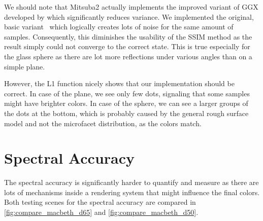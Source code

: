 We should note that Mitsuba2 actually implements the improved variant of GGX developed by \citet{heitz2018sampling} which significantly reduces variance. We implemented the original, basic variant~\cite{walter2007microfacet} which logically creates lots of noise for the same amount of samples. Consequently, this diminishes the usability of the SSIM method as the result simply could not converge to the correct state. This is true especially for the glass sphere as there are lot more reflections under various angles than on a simple plane.

However, the L1 function nicely shows that our implementation should be correct. In case of the plane, we see only few dots, signaling that some samples might have brighter colors. In case of the sphere, we can see a larger groups of the dots at the bottom, which is probably caused by the general rough surface model and not the microfacet distribution, as the colors match.

\section{Spectral Accuracy}

The spectral accuracy is significantly harder to quantify and measure as there are lots of mechanisms inside a rendering system that might influence the final colors. Both testing scenes for the spectral accuracy are compared in \autoref{fig:compare_macbeth_d65} and \autoref{fig:compare_macbeth_d50}.

